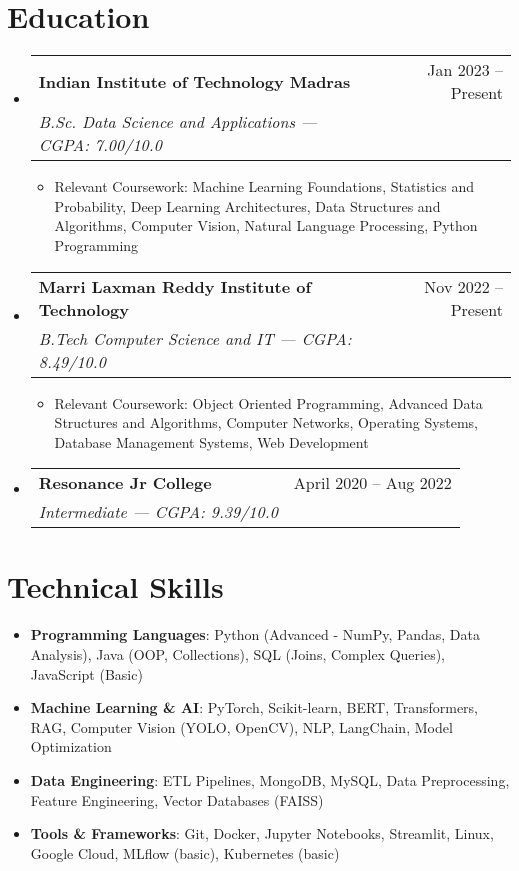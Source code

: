 \documentclass[letterpaper,10.8pt]{article}
\makeatletter
\newcommand{\resumeItem}[1]{
  \item\small{#1}
}
\newcommand{\resumeSubheading}[4]{
  \item
    \begin{tabular*}{0.97\textwidth}[t]{l@{\extracolsep{\fill}}r}
      \textbf{#1} & #2 \\
      \textit{\small#3} & \textit{\small #4} \\
    \end{tabular*}\vspace{-3pt}
}
\newcommand{\resumeSubHeadingListStart}{\begin{itemize}[leftmargin=0.15in, label={}, itemsep=2pt]}
\newcommand{\resumeSubHeadingListEnd}{\end{itemize}\vspace{0pt}}
\newcommand{\resumeItemListStart}{\begin{itemize}[leftmargin=*,itemsep=2pt,parsep=0pt,topsep=1pt]}
\newcommand{\resumeItemListEnd}{\end{itemize}\vspace{0pt}}
\makeatother
\begin{document}
\section{Education}
  \resumeSubHeadingListStart
    \resumeSubheading
      {Indian Institute of Technology Madras}{Jan 2023 -- Present}
      {B.Sc. Data Science and Applications — CGPA: 7.00/10.0}{}
      \resumeItemListStart
        \resumeItem{Relevant Coursework: Machine Learning Foundations, Statistics and Probability, Deep Learning Architectures, Data Structures and Algorithms, Computer Vision, Natural Language Processing, Python Programming}
      \resumeItemListEnd
    \resumeSubheading
      {Marri Laxman Reddy Institute of Technology}{Nov 2022 -- Present}
      {B.Tech Computer Science and IT — CGPA: 8.49/10.0}{}
      \resumeItemListStart
        \resumeItem{Relevant Coursework: Object Oriented Programming, Advanced Data Structures and Algorithms, Computer Networks, Operating Systems, Database Management Systems, Web Development}
      \resumeItemListEnd
    \resumeSubheading
      {Resonance Jr College}{April 2020 -- Aug 2022}
      {Intermediate — CGPA: 9.39/10.0}{}
  \resumeSubHeadingListEnd

\section{Technical Skills}
\resumeItemListStart
    \resumeItem{\textbf{Programming Languages}: Python (Advanced - NumPy, Pandas, Data Analysis), Java (OOP, Collections), SQL (Joins, Complex Queries), JavaScript (Basic)}
    \resumeItem{\textbf{Machine Learning \& AI}: PyTorch, Scikit-learn, BERT, Transformers, RAG, Computer Vision (YOLO, OpenCV), NLP, LangChain, Model Optimization}
    \resumeItem{\textbf{Data Engineering}: ETL Pipelines, MongoDB, MySQL, Data Preprocessing, Feature Engineering, Vector Databases (FAISS)}
    \resumeItem{\textbf{Tools \& Frameworks}: Git, Docker, Jupyter Notebooks, Streamlit, Linux, Google Cloud, MLflow (basic), Kubernetes (basic)}
\resumeItemListEnd

\end{document}
